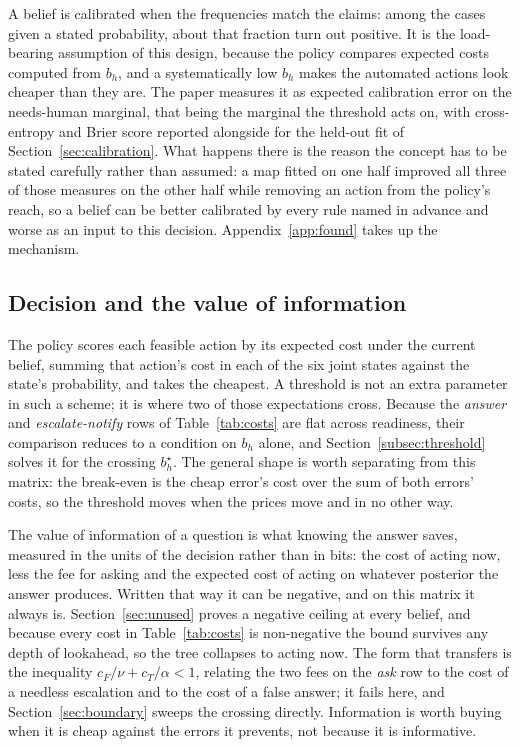 \documentclass{article}
\begin{document}
A belief is calibrated when the frequencies match the claims: among the cases given a
stated probability, about that fraction turn out positive. It is the load-bearing
assumption of this design, because the policy compares expected costs computed from
$b_h$, and a systematically low $b_h$ makes the automated actions look cheaper than
they are. The paper measures it as expected calibration error on the needs-human
marginal, that being the marginal the threshold acts on, with cross-entropy and Brier
score reported alongside for the held-out fit of Section~\ref{sec:calibration}. What
happens there is the reason the concept has to be stated carefully rather than assumed:
a map fitted on one half improved all three of those measures on the other half while
removing an action from the policy's reach, so a belief can be better calibrated by
every rule named in advance and worse as an input to this decision.
Appendix~\ref{app:found} takes up the mechanism.

\subsection{Decision and the value of information}

The policy scores each feasible action by its expected cost under the current belief,
summing that action's cost in each of the six joint states against the state's
probability, and takes the cheapest. A threshold is not an extra parameter in such a
scheme; it is where two of those expectations cross. Because the \emph{answer} and
\emph{escalate-notify} rows of Table~\ref{tab:costs} are flat across readiness, their
comparison reduces to a condition on $b_h$ alone, and Section~\ref{subsec:threshold}
solves it for the crossing $b_h^{\star}$. The general shape is worth separating from
this matrix: the break-even is the cheap error's cost over the sum of both errors'
costs, so the threshold moves when the prices move and in no other way.

The value of information of a question is what knowing the answer saves, measured in
the units of the decision rather than in bits: the cost of acting now, less the fee for
asking and the expected cost of acting on whatever posterior the answer produces.
Written that way it can be negative, and on this matrix it always is.
Section~\ref{sec:unused} proves a negative ceiling at every belief, and because every
cost in Table~\ref{tab:costs} is non-negative the bound survives any depth of
lookahead, so the tree collapses to acting now. The form that transfers is the
inequality $c_F/\nu + c_T/\alpha < 1$, relating the two fees on the \emph{ask} row to
the cost of a needless escalation and to the cost of a false answer; it fails here, and
Section~\ref{sec:boundary} sweeps the crossing directly. Information is worth buying
when it is cheap against the errors it prevents, not because it is informative.
\end{document}
